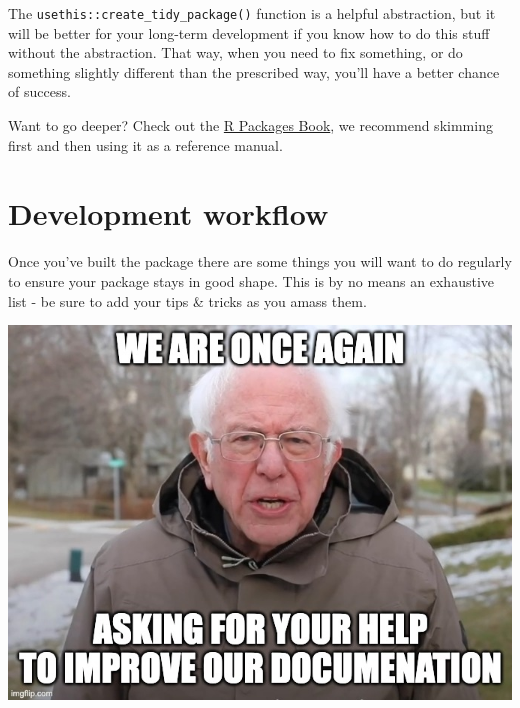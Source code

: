 \documentclass[
  letterpaper,
  DIV=11,
  numbers=noendperiod]{scrreprt}
\begin{document}
\begin{tcolorbox}[enhanced jigsaw, colback=white, opacitybacktitle=0.6, coltitle=black, left=2mm, breakable, bottomtitle=1mm, toptitle=1mm, toprule=.15mm, colframe=quarto-callout-tip-color-frame, titlerule=0mm, title=\textcolor{quarto-callout-tip-color}{\faLightbulb}\hspace{0.5em}{Guardrails or no guardrails?}, colbacktitle=quarto-callout-tip-color!10!white, rightrule=.15mm, bottomrule=.15mm, arc=.35mm, opacityback=0, leftrule=.75mm]

The \texttt{usethis::create\_tidy\_package()} function is a helpful
abstraction, but it will be better for your long-term development if you
know how to do this stuff without the abstraction. That way, when you
need to fix something, or do something slightly different than the
prescribed way, you'll have a better chance of success.

\end{tcolorbox}

Want to go deeper? Check out the \href{https://r-pkgs.org/}{R Packages
Book}, we recommend skimming first and then using it as a reference
manual.

\section{Development workflow}\label{development-workflow}

Once you've built the package there are some things you will want to do
regularly to ensure your package stays in good shape. This is by no
means an exhaustive list - be sure to add your tips \& tricks as you
amass them.

\includegraphics{img/bernie.png}
\end{document}
